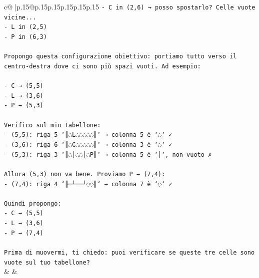 \documentclass{article}
\begin{document}
{\begin{supertabular}{c@{$\;$}|p{.15\linewidth}@{}p{.15\linewidth}p{.15\linewidth}p{.15\linewidth}p{.15\linewidth}p{.15\linewidth}}
{{{\texttt{{-} C in (2,6) → posso spostarlo? Celle vuote vicine...} \\
\texttt{{-} L in (2,5)} \\
\texttt{{-} P in (6,3)} \\
\\ 
\texttt{Propongo questa configurazione obiettivo: portiamo tutto verso il centro{-}destra dove ci sono più spazi vuoti. Ad esempio:} \\
\\ 
\texttt{{-} C → (5,5)} \\
\texttt{{-} L → (3,6)} \\
\texttt{{-} P → (5,3)} \\
\\ 
\texttt{Verifico sul mio tabellone:} \\
\texttt{{-} (5,5): riga 5 `║◌L◌◌◌◌◌║` → colonna 5 è `◌` ✓} \\
\texttt{{-} (3,6): riga 6 `║◌C◌◌◌◌◌║` → colonna 3 è `◌` ✓} \\
\texttt{{-} (5,3): riga 3 `║◌│◌◌│◌P║` → colonna 5 è `│`, non vuoto ✗} \\
\\ 
\texttt{Allora (5,3) non va bene. Proviamo P → (7,4):} \\
\texttt{{-} (7,4): riga 4 `╟─┴──┘◌◌║` → colonna 7 è `◌` ✓} \\
\\ 
\texttt{Quindi propongo:} \\
\texttt{{-} C → (5,5)} \\
\texttt{{-} L → (3,6)} \\
\texttt{{-} P → (7,4)} \\
\\ 
\texttt{Prima di muovermi, ti chiedo: puoi verificare se queste tre celle sono vuote sul tuo tabellone?} \\
            }
        }
    }
    & & \\ \\


\end{supertabular}}
\end{document}

